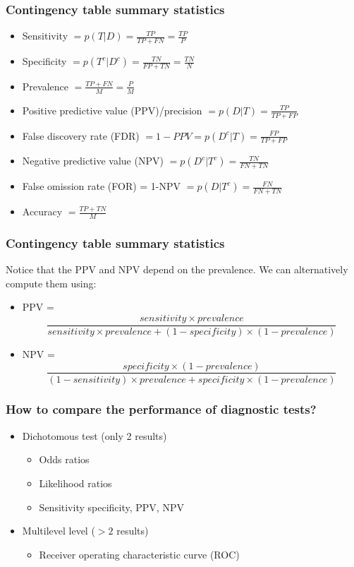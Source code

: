 \documentclass[t]{beamer}
\begin{document}
\begin{frame}
\frametitle{Contingency table summary statistics}
\begin{itemize}
	\item \alert{Sensitivity} $= p(T|D) = \frac{TP}{TP+FN}=\frac{TP}{P} $
	\pause
	\item \alert{Specificity} $= p(T^c|D^c) = \frac{TN}{FP+TN}=\frac{TN}{N}$
	\pause
	\item \alert{Prevalence} $= \frac{TP+FN}{M}=\frac{P}{M}$
	\pause
	\item \alert{Positive predictive value (PPV)/precision} $= p(D|T) = \frac{TP}{TP+FP}$
	\pause
	\item \alert{False discovery rate (FDR)} $= 1-PPV = p(D^c|T) = \frac{FP}{TP+FP}$
	\pause
	\item \alert{Negative predictive value (NPV)} $= p(D^c|T^c) = \frac{TN}{FN+TN}$
	\pause
		\item \alert{False omission rate (FOR)} = 1-NPV $= p(D|T^c) = \frac{FN}{FN+TN}$
	\pause
	\item \alert{Accuracy} $= \frac{TP+TN}{M}$
\end{itemize}
\end{frame}

\begin{frame}
\frametitle{Contingency table summary statistics}
Notice that the PPV and NPV depend on the prevalence. We can alternatively compute them using:
\begin{itemize}
	\item PPV = 
	$$
	\frac{sensitivity \times prevalence}{sensitivity \times prevalence + (1- specificity) \times (1-prevalence)}
	$$
		\item NPV =
		$$
		\frac{specificity \times (1-prevalence)}{(1-sensitivity) \times prevalence + specificity \times (1-prevalence)}
		$$
\end{itemize}
\end{frame}


\begin{frame}
\frametitle{How to compare the performance of diagnostic tests?}

\begin{itemize}
\item Dichotomous test (only 2 results)
\pause
\begin{itemize}
\item Odds ratios
\item Likelihood ratios
\item Sensitivity specificity, PPV, NPV

\end{itemize}

\pause
\item Multilevel level ($>2$ results)
\pause
\begin{itemize}
\item Receiver operating characteristic curve (ROC)
\end{itemize}
\end{itemize}
\end{frame} 
\end{document}
